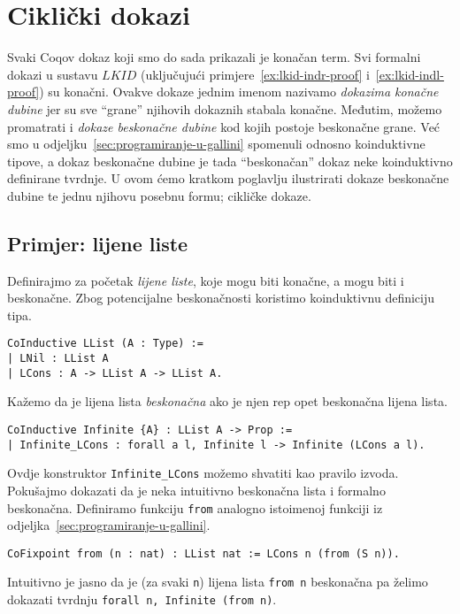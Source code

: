 \chapter{Ciklički dokazi}\label{cha:cikliki-dokazi}
Svaki Coqov dokaz koji smo do sada prikazali je konačan term.
Svi formalni dokazi u sustavu \(\mathit{LKID}\) (uključujući primjere~\ref{ex:lkid-indr-proof} i~\ref{ex:lkid-indl-proof}) su konačni.
Ovakve dokaze jednim imenom nazivamo \textit{dokazima konačne dubine}
jer su sve \enquote{grane} njihovih dokaznih stabala konačne.
Međutim, možemo promatrati i \textit{dokaze beskonačne dubine} kod kojih postoje beskonačne grane.
Već smo u odjeljku~\ref{sec:programiranje-u-gallini} spomenuli odnosno koinduktivne tipove,
a dokaz beskonačne dubine je tada \enquote{beskonačan} dokaz neke koinduktivno definirane tvrdnje.
U ovom ćemo kratkom poglavlju ilustrirati dokaze beskonačne dubine te jednu njihovu posebnu formu;
cikličke dokaze.

\section{Primjer: lijene liste}
Definirajmo za početak \textit{lijene liste}, koje mogu biti konačne, a mogu biti i beskonačne.
Zbog potencijalne beskonačnosti koristimo koinduktivnu definiciju tipa.
\begin{verbatim}
CoInductive LList (A : Type) :=
| LNil : LList A
| LCons : A -> LList A -> LList A.
\end{verbatim}
\noindent Kažemo da je lijena lista \textit{beskonačna} ako je njen rep opet beskonačna lijena lista.
\begin{verbatim}
CoInductive Infinite {A} : LList A -> Prop :=
| Infinite_LCons : forall a l, Infinite l -> Infinite (LCons a l).
\end{verbatim}
\noindent Ovdje konstruktor \texttt{Infinite\_LCons} možemo shvatiti kao pravilo izvoda.
Pokušajmo dokazati da je neka intuitivno beskonačna lista i formalno beskonačna.
Definiramo funkciju \texttt{from} analogno istoimenoj funkciji iz odjeljka~\ref{sec:programiranje-u-gallini}.
\begin{verbatim}
CoFixpoint from (n : nat) : LList nat := LCons n (from (S n)).
\end{verbatim}
\noindent Intuitivno je jasno da je (za svaki \texttt{n}) lijena lista \texttt{from n}
beskonačna pa želimo dokazati tvrdnju \texttt{forall n, Infinite (from n)}.

